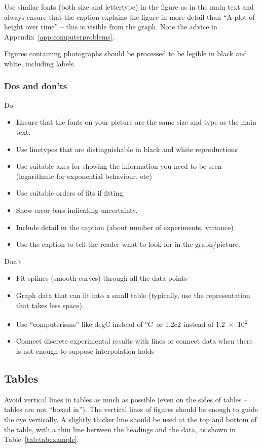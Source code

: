 \documentclass[a5paper, 10pt]{article}
\begin{document}
Use similar fonts (both size and lettertype) in the figure as in the
main text and always ensure that the caption explains the figure in
more detail than ``A plot of height over time'' -- this is visible from the
graph.  Note the advice in Appendix~\ref{app:computerproblems}.

Figures containing photographs should be processed to be legible in
black and white, including labels.

\subsubsection*{Dos and don'ts}
Do
\begin{itemize}
\item Ensure that the fonts on your picture are the same size and type as
  the main text.
\item Use linetypes that are distinguishable in black and white
  reproductions
\item Use suitable axes for showing the information you need to be seen
  (logarithmic for exponential behaviour, etc)
\item Use suitable orders of fits if fitting.
\item Show error bars indicating uncertainty.
\item Include detail in the caption (about number of experiments,
  variance)
\item Use the caption to tell the reader what to look for in the graph/picture.
\end{itemize}

Don't
\begin{itemize}
\item Fit splines (smooth curves) through all the data points

\item Graph data that can fit into a small table (typically, use the
  representation that takes less space).
\item Use ``computerisms'' like degC instead of \si{\celsius}\ or 1.2e2
  instead of \num{1.2e2} 
\item Connect discrete experimental results with lines or connect data when there is not enough to suppose interpolation holds
\end{itemize}

\subsection{Tables}
Avoid vertical lines in tables as much as possible (even on the sides
of tables -- tables are not ``boxed in'').  The vertical
lines of figures should be enough to guide the eye vertically.  A
slightly thicker line should be used at the top and bottom of the
table, with a thin line between the headings and the data, as shown in
Table~\ref{tab:tabexample}.
\end{document}
